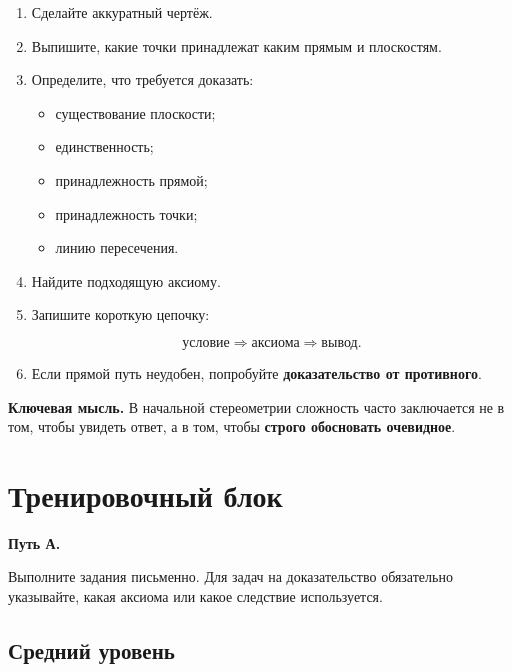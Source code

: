 \documentclass[a4paper,12pt]{article}
\newcommand{\keyidea}[1]{%
  \par\medskip
  {\color{darkaccent}\bfseries Ключевая мысль.} #1
  \par\medskip
}
\begin{document}
\begin{enumerate}
  \item Сделайте аккуратный чертёж.

  \item Выпишите, какие точки принадлежат каким прямым и плоскостям.

  \item Определите, что требуется доказать:
  \begin{itemize}
    \item существование плоскости;
    \item единственность;
    \item принадлежность прямой;
    \item принадлежность точки;
    \item линию пересечения.
  \end{itemize}

  \item Найдите подходящую аксиому.

  \item Запишите короткую цепочку:

  \[
  \text{условие}
  \Longrightarrow
  \text{аксиома}
  \Longrightarrow
  \text{вывод}.
  \]

  \item Если прямой путь неудобен, попробуйте
  \textbf{доказательство от противного}.
\end{enumerate}

\keyidea{
В начальной стереометрии сложность часто заключается не в том,
чтобы увидеть ответ, а в том, чтобы \textbf{строго обосновать очевидное}.
}


\clearpage

\section*{Тренировочный блок}

\textbf{Путь А.}

Выполните задания письменно.
Для задач на доказательство обязательно указывайте,
какая аксиома или какое следствие используется.

\subsection*{Средний уровень}
\end{document}
